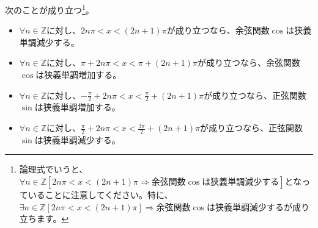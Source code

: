 \documentclass[dvipdfmx]{jsarticle}
\begin{document}
\begin{thm}\label{4.3.1.22} 次のことが成り立つ\footnote{論理式でいうと、$\forall n \in \mathbb{Z}\left[ 2n\pi < x < (2n + 1)\pi \Rightarrow 余弦関数\cos は狭義単調減少する \right]$となっていることに注意してください。特に、$\exists n \in \mathbb{Z}\left[ 2n\pi < x < (2n + 1)\pi \right] \Rightarrow 余弦関数\cos は狭義単調減少する$が成り立ちます。}。
\begin{itemize}
\item
  $\forall n \in \mathbb{Z}$に対し、$2n\pi < x < (2n + 1)\pi$が成り立つなら、余弦関数$\cos$は狭義単調減少する。
\item
  $\forall n \in \mathbb{Z}$に対し、$\pi + 2n\pi < x < \pi + (2n + 1)\pi$が成り立つなら、余弦関数$\cos$は狭義単調増加する。
\item
  $\forall n \in \mathbb{Z}$に対し、$- \frac{\pi}{2} + 2n\pi < x < \frac{\pi}{2} + (2n + 1)\pi$が成り立つなら、正弦関数$\sin$は狭義単調増加する。
\item
  $\forall n \in \mathbb{Z}$に対し、$\frac{\pi}{2} + 2n\pi < x < \frac{3\pi}{2} + (2n + 1)\pi$が成り立つなら、正弦関数$\sin$は狭義単調減少する。
\end{itemize}
\end{thm}
\end{document}
